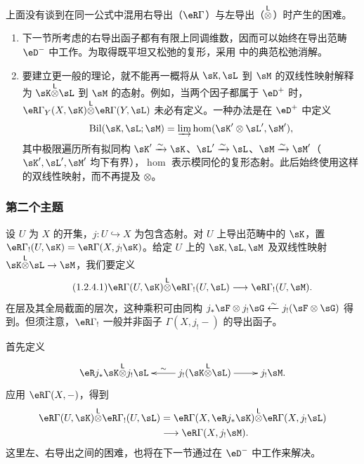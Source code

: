 \subsubsection{}\label{IV:1-2-3}
上面没有谈到在同一公式中混用右导出（$\eR\Gamma$）与左导出（${\overset{\mathsf{L}}{\otimes}}$）时产生的困难。
\begin{enumerate}[\indent a)]
\item 下一节所考虑的右导出函子都有有限上同调维数，因而可以始终在导出范畴 $\eD^-$ 中工作。为取得既平坦又松弛的复形，采用 \cite[XVII]{sga4} 中的典范松弛消解。
\item 要建立更一般的理论，就不能再一概将从 $\sK,\sL$ 到 $\sM$ 的双线性映射解释为 $\sK\lotimes\sL$ 到 $\sM$ 的态射。例如，当两个因子都属于 $\eD^+$ 时，$\eR\Gamma_Y(X,\sK)\lotimes\eR\Gamma(Y,\sL)$ 未必有定义。一种办法是在 $\eD^+$ 中定义
\[
\operatorname{Bil}(\sK,\sL;\sM)=\varinjlim\hom(\sK'\otimes\sL',\sM'),
\]
其中极限遍历所有拟同构 $\sK'\iso\sK$、$\sL'\iso\sL$、$\sM\iso\sM'$（$\sK',\sL',\sM'$ 均下有界），$\hom$ 表示模同伦的复形态射。此后始终使用这样的双线性映射，而不再提及 $\otimes$。
\end{enumerate}

\subsubsection{第二个主题}\label{IV:1-2-4}
设 $U$ 为 $X$ 的开集，$j:U\hookrightarrow X$ 为包含态射。对 $U$ 上导出范畴中的 $\sK$，置 $\eR\Gamma_!(U,\sK)=\eR\Gamma(X,j_!\sK)$。给定 $U$ 上的 $\sK,\sL,\sM$ 及双线性映射 $\sK\lotimes\sL\to\sM$，我们要定义
\begin{equation*}\tag{1.2.4.1}\label{IV:eq:1-2-4-1}
\eR\Gamma(U,\sK)\lotimes\eR\Gamma_!(U,\sL)\longrightarrow\eR\Gamma_!(U,\sM).
\end{equation*}
在层及其全局截面的层次，这种乘积可由同构 $j_*\sF\otimes j_!\sG\xleftarrow\sim j_!(\sF\otimes\sG)$ 得到。但须注意，$\eR\Gamma_!$ 一般并非函子 $\Gamma(X,j_!-)$ 的导出函子。

首先定义
\[\xymatrix{\eR j_*\sK\lotimes j_!\sL&\ar[l]_-\sim j_!(\sK\lotimes\sL)\ar[r]&j_!\sM.}\]
应用 $\eR\Gamma(X,-)$，得到
\[
\begin{aligned}
\eR\Gamma(U,\sK)\lotimes\eR\Gamma_!(U,\sL)
&=\eR\Gamma(X,\eR j_*\sK)\lotimes\eR\Gamma(X,j_!\sL)\\
&\longrightarrow\eR\Gamma(X,j_!\sM).
\end{aligned}
\]
这里左、右导出之间的困难，也将在下一节通过在 $\eD^-$ 中工作来解决。

